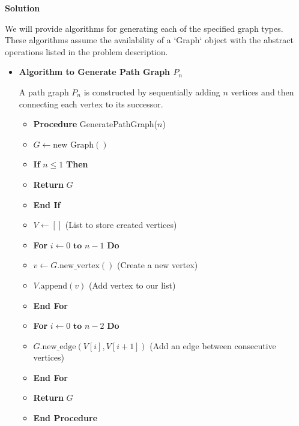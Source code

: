 \documentclass{article}
\begin{document}
\textbf{Solution}

We will provide algorithms for generating each of the specified graph types. These algorithms assume the availability of a `Graph` object with the abstract operations listed in the problem description.

\begin{itemize}
    \item \textbf{Algorithm to Generate Path Graph $P_n$}
    
    A path graph $P_n$ is constructed by sequentially adding $n$ vertices and then connecting each vertex to its successor.
    
    \begin{itemize}
        \item \textbf{Procedure} GeneratePathGraph($n$)
        \item \hspace{0.5cm} $G \gets \text{new Graph}()$
        \item \hspace{0.5cm} \textbf{If} $n \le 1$ \textbf{Then}
        \item \hspace{1cm} \textbf{Return} $G$
        \item \hspace{0.5cm} \textbf{End If}
        \item \hspace{0.5cm} $V \gets []$ (List to store created vertices)
        \item \hspace{0.5cm} \textbf{For} $i \gets 0 \textbf{ to } n-1$ \textbf{Do}
        \item \hspace{1cm} $v \gets G.\text{new\_vertex}()$ (Create a new vertex)
        \item \hspace{1cm} $V.\text{append}(v)$ (Add vertex to our list)
        \item \hspace{0.5cm} \textbf{End For}
        \item \hspace{0.5cm} \textbf{For} $i \gets 0 \textbf{ to } n-2$ \textbf{Do}
        \item \hspace{1cm} $G.\text{new\_edge}(V[i], V[i+1])$ (Add an edge between consecutive vertices)
        \item \hspace{0.5cm} \textbf{End For}
        \item \hspace{0.5cm} \textbf{Return} $G$
        \item \textbf{End Procedure}
    \end{itemize}


\end{itemize}
\end{document}
